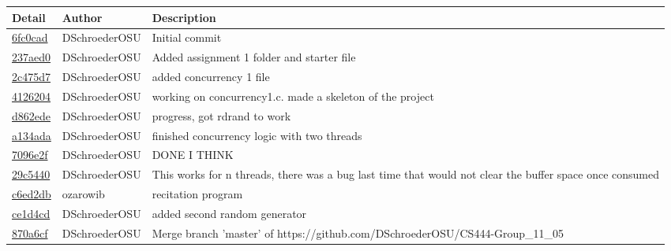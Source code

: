 \begin{tabular}{l l l}\textbf{Detail} & \textbf{Author} & \textbf{Description}\\\hline
\href{https://github.com/DSchroederOSU/CS444-Group_11_05/commit/6fc0cad45a2a515f54c120fa6d411cbb62a0eed5}{6fc0cad} & DSchroederOSU & Initial commit\\\hline
\href{https://github.com/DSchroederOSU/CS444-Group_11_05/commit/237aed09afe1e61e9421f419164f4d41387adddd}{237aed0} & DSchroederOSU & Added assignment 1 folder and starter file\\\hline
\href{https://github.com/DSchroederOSU/CS444-Group_11_05/commit/2c475d7e15d1a54406c275a2a27c5df472c46ded}{2c475d7} & DSchroederOSU & added concurrency 1 file\\\hline
\href{https://github.com/DSchroederOSU/CS444-Group_11_05/commit/4126204c49cd2e10090eb4d6bd3183bc23c94648}{4126204} & DSchroederOSU & working on concurrency1.c. made a skeleton of the project\\\hline
\href{https://github.com/DSchroederOSU/CS444-Group_11_05/commit/d862edec54dd0eb51bdde6e26337315a2675d434}{d862ede} & DSchroederOSU & progress, got rdrand to work\\\hline
\href{https://github.com/DSchroederOSU/CS444-Group_11_05/commit/a134adaeeff0b0ebc7bc662d809edc973ab6f841}{a134ada} & DSchroederOSU & finished concurrency logic with two threads\\\hline
\href{https://github.com/DSchroederOSU/CS444-Group_11_05/commit/7096e2f214d8f164dcf02c58d8924f903281e867}{7096e2f} & DSchroederOSU & DONE I THINK\\\hline
\href{https://github.com/DSchroederOSU/CS444-Group_11_05/commit/29c5440b4d14c3656d11c907e8794f6f08d98897}{29c5440} & DSchroederOSU & This works for n threads, there was a bug last time that would not clear the buffer space once consumed\\\hline
\href{https://github.com/DSchroederOSU/CS444-Group_11_05/commit/c6ed2db4aab53f542abd8a00c05c9cf7953d9712}{c6ed2db} & ozarowib & recitation program\\\hline
\href{https://github.com/DSchroederOSU/CS444-Group_11_05/commit/ce1d4cd2a712b1dfed27d304539fd552d15c4c6c}{ce1d4cd} & DSchroederOSU & added second random generator\\\hline
\href{https://github.com/DSchroederOSU/CS444-Group_11_05/commit/870a6cf75e9cf205425b40b0fd90a21bece56299}{870a6cf} & DSchroederOSU & Merge branch 'master' of https://github.com/DSchroederOSU/CS444-Group_11_05\\\hline

\end{tabular}

